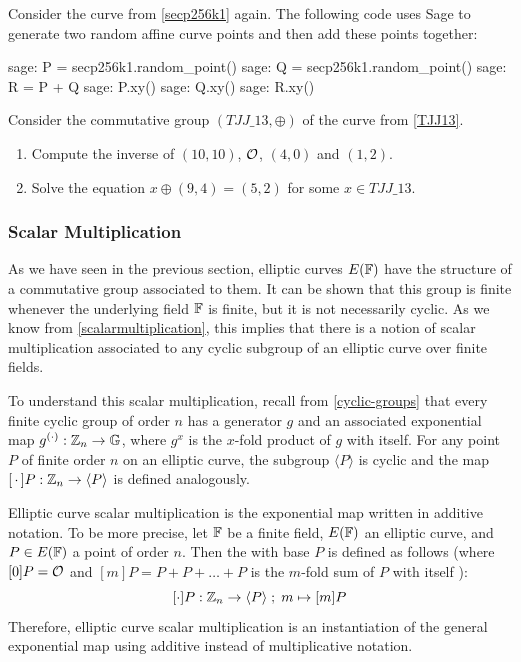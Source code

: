 \begin{example}
Consider the  curve from \examplename{} \ref{secp256k1} again. The following code uses Sage to generate two random affine curve points and then add these points together: 
\begin{sagecommandline}
sage: P = secp256k1.random_point()
sage: Q = secp256k1.random_point()
sage: R = P + Q
sage: P.xy()
sage: Q.xy()
sage: R.xy()
\end{sagecommandline}
\end{example}
\begin{exercise}
Consider the commutative group $(\mathit{TJJ\_13},\oplus)$ of the  curve from \examplename{} \ref{TJJ13}. 
\begin{enumerate}
\item Compute the inverse of $(10,10)$, $\mathcal{O}$, $(4,0)$ and $(1,2)$.
\item Solve the equation $x \oplus (9,4) = (5,2) $ for some $x\in \mathit{TJJ\_13}$.
\end{enumerate}
\end{exercise}

\subsubsection{Scalar Multiplication}
As we have seen in the previous section, elliptic curves $E(\mathbb{F})$ have the structure of a commutative group associated to them. It can be shown that this group is finite whenever the underlying field $\mathbb{F}$ is finite, but it is not necessarily cyclic. As we know from \eqref{scalarmultiplication}, this implies that there is a notion of scalar multiplication associated to any cyclic subgroup of an elliptic curve over finite fields.

To understand this scalar multiplication, recall from  \ref{cyclic-groups} that every finite cyclic group of order $n$ has a generator $g$ and an associated exponential map $g^{(\cdot)}: \mathbb{Z}_n \to \mathbb{G}$, where $g^x$ is the $x$-fold product of $g$ with itself. For any point $P$ of finite order $n$ on an elliptic curve, the subgroup $\langle P\rangle$ is cyclic and the map $[\,\cdot\,]P:\mathbb{Z}_n\to \langle P\rangle$ is defined analogously.

Elliptic curve scalar multiplication is the exponential map written in additive notation. To be more precise, let $\mathbb{F}$ be a finite field, $E(\mathbb{F})$ an elliptic curve, and $P\in E(\mathbb{F})$ a point of order $n$. Then the  with base $P$ is defined as follows (where $[0]P = \mathcal{O}$ and $[m]P = P+P+\ldots + P$ is the $m$-fold sum of $P$ with itself ):
$$
[\cdot]P: \mathbb{Z}_n \to \langle P\rangle\;;\; m \mapsto [m]P
$$
Therefore, elliptic curve scalar multiplication is an instantiation of the general exponential map using additive instead of multiplicative notation.

